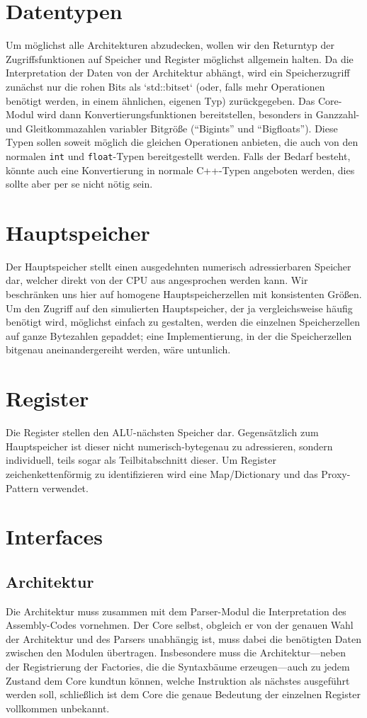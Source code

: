 \section{Datentypen}

Um möglichst alle Architekturen abzudecken, wollen wir den Returntyp der Zugriffsfunktionen auf Speicher und Register möglichst allgemein halten. Da die Interpretation der Daten von der Architektur abhängt, wird ein Speicherzugriff zunächst nur die rohen Bits als `std::bitset` (oder, falls mehr Operationen benötigt werden, in einem ähnlichen, eigenen Typ) zurückgegeben. Das Core-Modul wird dann Konvertierungsfunktionen bereitstellen, besonders in Ganzzahl- und Gleitkommazahlen variabler Bitgrö{\ss}e (``Bigints'' und ``Bigfloats''). Diese Typen sollen soweit möglich die gleichen Operationen anbieten, die auch von den normalen \lstinline!int! und \lstinline!float!-Typen bereitgestellt werden. Falls der Bedarf besteht, könnte auch eine Konvertierung in normale C++-Typen angeboten werden, dies sollte aber per se nicht nötig sein.


\section{Hauptspeicher}
Der Hauptspeicher stellt einen ausgedehnten numerisch adressierbaren Speicher dar, welcher direkt von der CPU aus angesprochen werden kann. Wir beschränken uns hier auf homogene Hauptspeicherzellen mit konsistenten Grö{\ss}en. Um den Zugriff auf den simulierten Hauptspeicher, der ja vergleichsweise häufig benötigt wird, möglichst einfach zu gestalten, werden die einzelnen Speicherzellen auf ganze Bytezahlen gepaddet; eine Implementierung, in der die Speicherzellen bitgenau aneinandergereiht werden, wäre untunlich.

\section{Register}
Die Register stellen den ALU-nächsten Speicher dar. Gegensätzlich zum Hauptspeicher ist dieser nicht numerisch-bytegenau zu adressieren, sondern individuell, teils sogar als Teilbitabschnitt dieser.  Um Register zeichenkettenförmig zu identifizieren wird eine Map/Dictionary und das Proxy-Pattern verwendet.

\section{Interfaces}

\subsection{Architektur}
Die Architektur muss zusammen mit dem Parser-Modul die Interpretation des Assembly-Codes vornehmen. Der Core selbst, obgleich er von der genauen Wahl der Architektur und des Parsers unabhängig ist, muss dabei die benötigten Daten zwischen den Modulen übertragen. Insbesondere muss die Architektur---neben der Registrierung der Factories, die die Syntaxbäume erzeugen---auch zu jedem Zustand dem Core kundtun können, welche Instruktion als nächstes ausgeführt werden soll, schließlich ist dem Core die genaue Bedeutung der einzelnen Register vollkommen unbekannt.

